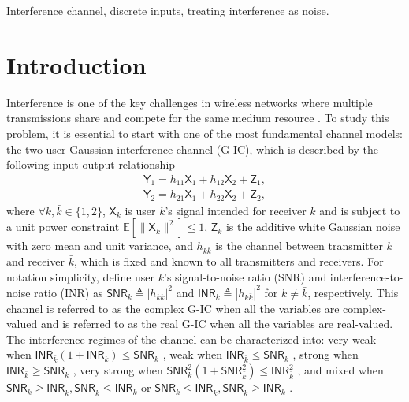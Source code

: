 \documentclass[12pt, draftclsnofoot, onecolumn]{IEEEtran}
\newcommand{\msf}[1]{\mathsf{#1}}
\newcommand{\SNR}{\msf{SNR}}
\newcommand{\INR}{\msf{INR}}
\newcommand{\E}{\mathbb{E}}
\theoremstyle{definition}
\begin{document}
\begin{IEEEkeywords}
Interference channel, discrete inputs, treating interference as noise.
\end{IEEEkeywords}

\section{Introduction}\label{sec:intro}
Interference is one of the key challenges in wireless networks where multiple transmissions share and compete for the same medium resource \cite{Network_IT}. To study this problem, it is essential to start with one of the most fundamental channel models: the two-user Gaussian interference channel (G-IC), which is described by the following input-output relationship
\begin{align}
\msf{Y}_1 = h_{11}\msf{X}_1+h_{12}\msf{X}_2+\msf{Z}_1, \label{eq:gic_1}\\
\msf{Y}_2 = h_{21}\msf{X}_1+h_{22}\msf{X}_2+\msf{Z}_2, \label{eq:gic_2}
\end{align}
where $\forall k,\bar{k} \in \{1,2\}$, $\msf{X}_k$ is user $k$'s signal intended for receiver $k$ and is subject to a unit power constraint $\E[\|\msf{X}_k \|^2]\leq1$, $\msf{Z}_k$ is the additive white Gaussian noise with zero mean and unit variance, and $h_{k\bar{k}}$ is the channel between transmitter $k$ and receiver $\bar{k}$, which is fixed and known to all transmitters and receivers. For notation simplicity, define user $k$'s signal-to-noise ratio (SNR) and interference-to-noise ratio (INR) as $\SNR_k \triangleq |h_{kk}|^2$ and $\INR_k \triangleq |h_{k\bar{k}}|^2$ for $k\neq \bar{k}$, respectively. This channel is referred to as the complex G-IC when all the variables are complex-valued and is referred to as the real G-IC when all the variables are real-valued. The interference regimes of the channel can be characterized into: very weak when $\INR_{\bar{k}}(1+\INR_k) \leq \SNR_k$ \cite{7051266}, weak when $\INR_{\bar{k}} \leq \SNR_k$ \cite{4675741}, strong when $\INR_{\bar{k}} \geq \SNR_k$ \cite{4675741}, very strong when $\SNR^2_k(1+\SNR^2_{\bar{k}}) \leq \INR^2_{\bar{k}}$ \cite{1056416}, and mixed when $\SNR_k \geq \INR_{\bar{k}},\SNR_{\bar{k}}\leq  \INR_k$ or $\SNR_k \leq \INR_{\bar{k}},\SNR_{\bar{k}} \geq  \INR_k$ \cite{4675741}.
\end{document}

